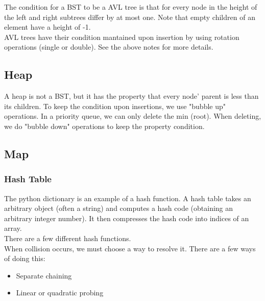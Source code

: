 \documentclass[]{article}
\begin{document}
The condition for a BST to be a AVL tree is that for every node in the height of the left and right subtrees differ by at most one. Note that empty children of an element have a height of -1.\\

AVL trees have their condition mantained upon insertion by using rotation operations (single or double). See the above notes for more details.\\

\subsection{Heap}\bigbreak

A heap is not a BST, but it has the property that every node' parent is less than its children. To keep the condition upon insertions, we use "bubble up" operations. In a priority queue, we can only delete the min (root). When deleting, we do "bubble down" operations to keep the property condition.\\


\subsection{Map}\bigbreak

\subsubsection{Hash Table}\bigbreak

The python dictionary is an example of a hash function. A hash table takes an arbitrary object (often a string) and computes a hash code (obtaining an arbitrary integer number). It then compresses the hash code into indices of an array.\\

There are a few different hash functions.\\

When collision occurs, we must choose a way to resolve it. There are a few ways of doing this:

\begin{itemize}
	\item Separate chaining
	\item Linear or quadratic probing
\end{itemize}\bigbreak
\end{document}
